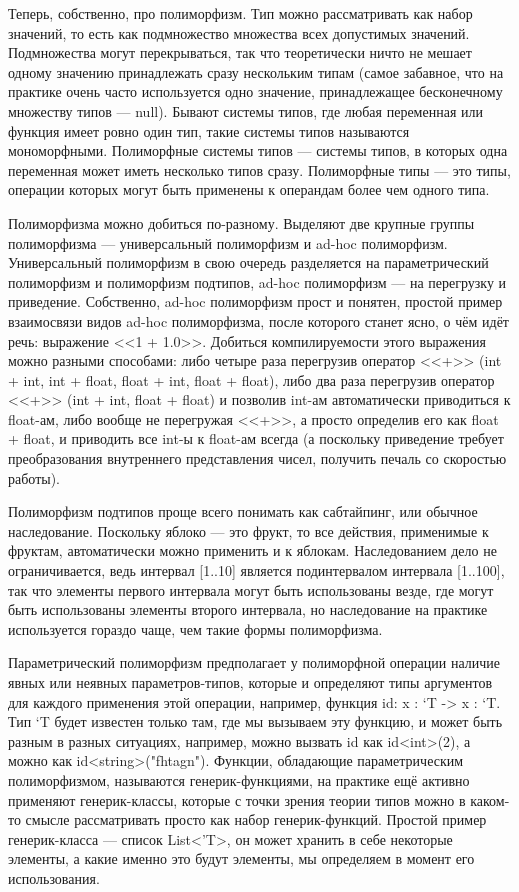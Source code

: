 \documentclass[a5paper]{article}
\begin{document}
Теперь, собственно, про полиморфизм. Тип можно рассматривать как набор значений, то есть как подмножество множества всех допустимых значений. Подмножества могут перекрываться, так что теоретически ничто не мешает одному значению принадлежать сразу нескольким типам (самое забавное, что на практике очень часто используется одно значение, принадлежащее бесконечному множеству типов --- null). Бывают системы типов, где любая переменная или функция имеет ровно один тип, такие системы типов называются мономорфными. Полиморфные системы типов --- системы типов, в которых одна переменная может иметь несколько типов сразу. Полиморфные типы --- это типы, операции которых могут быть применены к операндам более чем одного типа.

Полиморфизма можно добиться по-разному. Выделяют две крупные группы полиморфизма --- универсальный полиморфизм и ad-hoc полиморфизм. Универсальный полиморфизм в свою очередь разделяется на параметрический полиморфизм и полиморфизм подтипов, ad-hoc полиморфизм --- на перегрузку и приведение. Собственно, ad-hoc полиморфизм прост и понятен, простой пример взаимосвязи видов ad-hoc полиморфизма, после которого станет ясно, о чём идёт речь: выражение <<1 + 1.0>>. Добиться компилируемости этого выражения можно разными способами: либо четыре раза перегрузив оператор <<+>> (int + int, int + float, float + int, float + float), либо два раза перегрузив оператор <<+>> (int + int, float + float) и позволив int-ам автоматически приводиться к float-ам, либо вообще не перегружая <<+>>, а просто определив его как float + float, и приводить все int-ы к float-ам всегда (а поскольку приведение требует преобразования внутреннего представления чисел, получить печаль со скоростью работы).

Полиморфизм подтипов проще всего понимать как сабтайпинг, или обычное наследование. Поскольку яблоко --- это фрукт, то все действия, применимые к фруктам, автоматически можно применить и к яблокам. Наследованием дело не ограничивается, ведь интервал [1..10] является подинтервалом интервала [1..100], так что элементы первого интервала могут быть использованы везде, где могут быть использованы элементы второго интервала, но наследование на практике используется гораздо чаще, чем такие формы полиморфизма. 

Параметрический полиморфизм предполагает у полиморфной операции наличие явных или неявных параметров-типов, которые и определяют типы аргументов для каждого применения этой операции, например, функция id: x : ‘T -> x : ‘T. Тип ‘T будет известен только там, где мы вызываем эту функцию, и может быть разным в разных ситуациях, например, можно вызвать id как id<int>(2), а можно как id<string>("fhtagn"). Функции, обладающие параметрическим полиморфизмом, называются генерик-функциями, на практике ещё активно применяют генерик-классы, которые с точки зрения теории типов можно в каком-то смысле рассматривать просто как набор генерик-функций. Простой пример генерик-класса --- список List<’T>, он может хранить в себе некоторые элементы, а какие именно это будут элементы, мы определяем в момент его использования.
\end{document}

